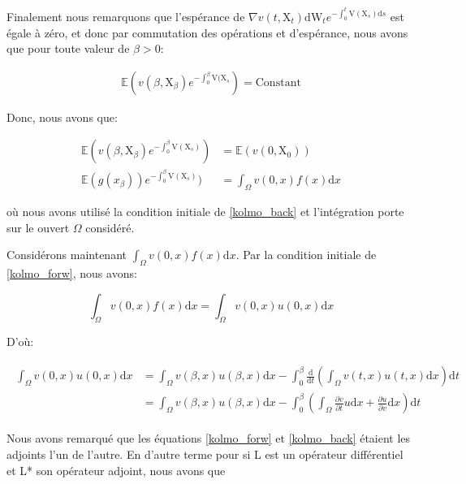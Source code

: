 \documentclass[11pt]{article}
\theoremstyle{definition}
\theoremstyle{remark}
\begin{document}
Finalement nous remarquons que l’espérance de $\nabla v(t, \mathrm{X}_t)\mathrm{dW}_{t} e^{-\int_0^{t} \mathrm{V}(\mathrm{X}_{s}) \mathrm{d}s}$ est égale à zéro, et donc par commutation des opérations et d’espérance, nous avons que pour toute valeur de $\beta > 0$: 

\begin{align}
\mathbb{E}(v(\beta , \mathrm{X}_{\beta})e^{-\int_0^{\beta} \mathrm{V}(\mathrm{X}_{s}}) = \mathrm{Constant}
\end{align}

Donc, nous avons que: 

\begin{align}
\mathbb{E}(v(\beta , \mathrm{X}_{\beta})e^{-\int_0^{\beta} \mathrm{V}(\mathrm{X}_{s})}) &= \mathbb{E}(v(0, \mathrm{X}_0)) \\
\mathbb{E}(g(x_{\beta}))e^{-\int_0^{\beta} \mathrm{V}(\mathrm{X}_{s})}) &= \int_{\Omega} v(0,x) f(x) \mathrm{d}x
\end{align}

où nous avons utilisé la condition initiale de \ref{kolmo_back} et l’intégration porte sur le ouvert $\Omega$ considéré. 

Considérons maintenant $\int_{\Omega} v(0,x) f(x) \mathrm{d}x$. Par la condition initiale de \ref{kolmo_forw}, nous avons:

\begin{equation}
\int_{\Omega} v(0,x) f(x) \mathrm{d}x = \int_{\Omega} v(0,x) u(0,x) \mathrm{d}x
\end{equation}

D'où:

\begin{align}
\label{expansion_integral_vu}
\begin{split}
\int_{\Omega} v(0,x) u(0,x) \mathrm{d}x &= \int_{\Omega} v(\beta, x) u(\beta,x) \mathrm{d}x - \int_{0}^{\beta} \frac{\mathrm{d}}{\mathrm{d}t}\left(\int_{\Omega} v(t,x) u(t,x) \mathrm{d}x \right) \mathrm{d}t \\
&= \int_{\Omega} v(\beta, x) u(\beta,x) \mathrm{d}x - \int_{0}^{\beta} \left( \int_{\Omega} \frac{\partial v}{\partial t} u \mathrm{d}x + \frac{\partial u}{\partial v} \mathrm{d}x \right) \mathrm{d}t
\end{split}
\end{align}

Nous avons remarqué que les équations \ref{kolmo_forw} et \ref{kolmo_back} étaient les adjoints l'un de l'autre. En d'autre terme pour si L est un opérateur différentiel et L* son opérateur adjoint, nous avons que 
\end{document}
